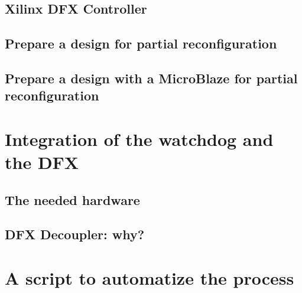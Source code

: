 \subsection{Xilinx DFX Controller}
\subsection{Prepare a design for partial reconfiguration}
\subsection{Prepare a design with a MicroBlaze for partial reconfiguration}

\section{Integration of the watchdog and the DFX}
\subsection{The needed hardware}
\subsection{DFX Decoupler: why?}

\section{A script to automatize the process}